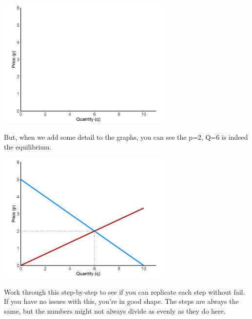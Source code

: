 \documentclass[11pt,]{article}
\begin{document}
\begin{center}
\includegraphics[width=0.65\textwidth]{../images/eq_blank.png}
\end{center}

But, when we add some detail to the graphs, you can see the p=2, Q=6 is
indeed the equilibrium.

\begin{center}
\includegraphics[width=0.65\textwidth]{../images/eg_equil.png}
\end{center}

Work through this step-by-step to see if you can replicate each step
without fail. If you have no issues with this, you're in good shape. The
steps are always the same, but the numbers might not always divide as
evenly as they do here.
\end{document}
